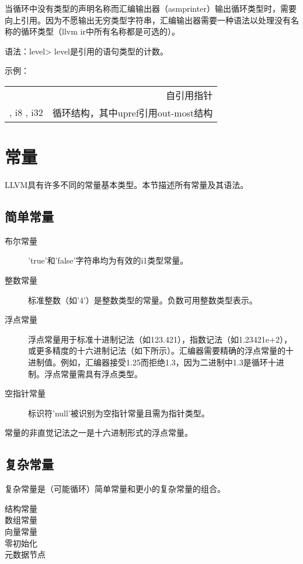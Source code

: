 \documentclass[12pt,a4paper]{article}
\begin{document}
{当循环中没有类型的声明名称而汇编输出器（asmprinter）输出循环类型时，需要向上引用。因为不愿输出无穷类型字符串，汇编输出器需要一种语法以处理没有名称的循环类型（llvm ir中所有名称都是可选的）。

语法：\<level>
level是引用的语句类型的计数。

示例：
\begin{tabular}{rr}
\1* & 自引用指针 \\
{ { \3*, i8 }, i32 } & 循环结构，其中upref引用out-most结构 \\
\end{tabular}

\section{常量}

LLVM具有许多不同的常量基本类型。本节描述所有常量及其语法。

\subsection{简单常量}

\begin{description}
\item[布尔常量] 'true'和'false'字符串均为有效的i1类型常量。
\item[整数常量] 标准整数（如'4'）是整数类型的常量。负数可用整数类型表示。
\item[浮点常量] 浮点常量用于标准十进制记法（如123.421），指数记法（如1.23421e+2），或更多精度的十六进制记法（如下所示）。汇编器需要精确的浮点常量的十进制值。例如，汇编器接受1.25而拒绝1.3，因为二进制中1.3是循环十进制。浮点常量需具有浮点类型。
\item[空指针常量] 标识符'null'被识别为空指针常量且需为指针类型。
\end{description}

常量的非直觉记法之一是十六进制形式的浮点常量。

\subsection{复杂常量}

复杂常量是（可能循环）简单常量和更小的复杂常量的组合。

\begin{description}
\item[结构常量] 
\item[数组常量] 
\item[向量常量] 
\item[零初始化] 
\item[元数据节点] 
\end{description}

}
\end{document}
